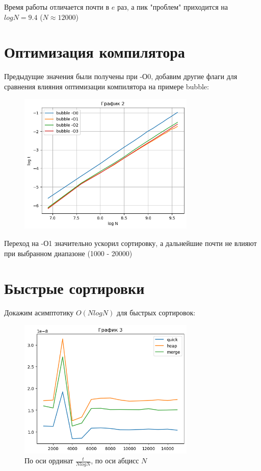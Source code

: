 \documentclass[12pt,onecolumn]{article}
\begin{document}
Время работы отличается почти в $e$ раз, а пик "проблем" приходится на $log N = 9.4$ ($N \approx 12000$)
\section{Оптимизация компилятора}

Предыдущие значения были получены при -О0, добавим другие флаги для сравнения влияния оптимизации компилятора на примере bubble:
\begin{figure}[H]
    \centering
    \includegraphics[width=0.75\textwidth]{Assets/graph2.png}
\end{figure}

Переход на -О1 значительно ускорил сортировку, а дальнейшие почти не влияют при выбранном диапазоне (1000 - 20000)
\section{Быстрые сортировки}

Докажим асимптотику $O(NlogN)$ для быстрых сортировок:
\begin{figure}[H]
    \centering
    \includegraphics[width=0.75\textwidth]{Assets/graph3.png}
    \caption{По оси ординат $\frac{t}{NlogN}$, по оси абцисс $N$}
\end{figure}
\end{document}
